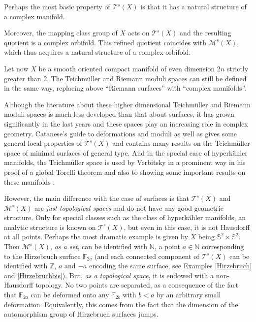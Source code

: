 \documentclass[10pt]{amsart}
\let\mathcal\mathscr
\theoremstyle{plain}
\theoremstyle{definition}
\theoremstyle{remark}
\numberwithin{equation}{section}
\begin{document}
Perhaps the most basic property of $\mathcal T^s(X)$ is that
it has a natural structure of a complex manifold.

Moreover, the mapping class group of $X$ acts on $\mathcal T^s(X)$ and the resulting quotient is a complex orbifold. This refined quotient coincides with $\mathcal M^s(X)$, which thus acquires a natural structure of a complex orbifold.

Let now $X$ be a smooth oriented compact manifold of even dimension $2n$ strictly greater than $2$. The Teichmüller and Riemann moduli spaces can still be defined in the same way, replacing above ``Riemann surfaces'' with ``complex manifolds''.

Although the literature about these higher dimensional Teichmüller and Riemann moduli spaces is much less developed than that about surfaces, it has grown significantly in the last years and these spaces play an increasing role in complex geometry. Catanese's guide to deformations and moduli \cite{Catsurvey} as well as \cite{Catsurvey2} gives some general local properties of $\mathcal T^s(X)$ and contains many results on the Teichmüller space of minimal surfaces of general type. And in the special case of hyperkähler manifolds, the Teichmüller space is used by Verbitsky in a prominent way in his proof of a global Torelli theorem \cite{Verbitsky} and also to showing some important results on these manifolds \cite{VerbitskyErgodic}.

However, the main difference with the case of surfaces is that $\mathcal T^s(X)$ and $\mathcal M^s(X)$ are \emph{just topological spaces} and do not have any good geometric structure. Only for special classes such as the class of hyperkähler manifolds, an analytic structure is known on $\mathcal T^s(X)$, but even in this case, it is not Hausdorff at all points. Perhaps the most dramatic example is given by $X$ being $\mathbb S^2\times\mathbb S^2$. Then $\mathcal M^s(X)$, \emph{as a set}, can be identified with $\mathbb N$, a point $a\in\mathbb N$ corresponding to the Hirzebruch surface $\mathbb F_{2a}$ (and each connected component of $\mathcal T^s(X)$ can be identified with $\mathbb Z$, $a$ and $-a$ encoding the same surface, see Examples \ref{Hirzebruch} and \ref{Hirzebruchbis}). But, \emph{as a topological space}, it is endowed with a non-Hausdorff topology. No two points are separated, as a consequence of the fact that $\mathbb F_{2a}$ can be deformed onto any $\mathbb F_{2b}$ with $b<a$ by an arbitrary small deformation. Equivalently, this comes from the fact that the dimension of the automorphism group of Hirzebruch surfaces jumps.
\end{document}
